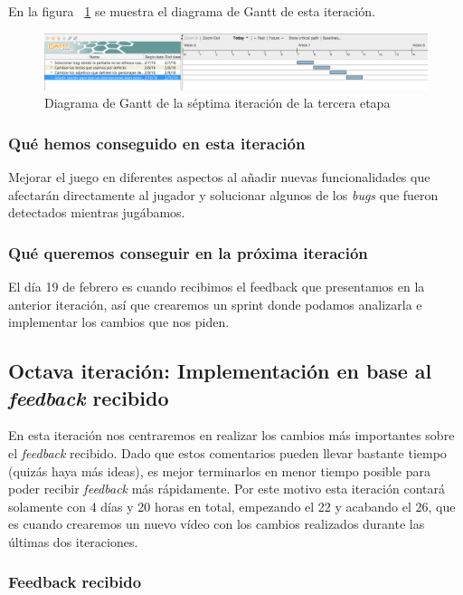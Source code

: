 En la figura ~\ref{fig:sec3it7} se muestra el diagrama de Gantt de esta iteración.

\begin{figure}
    \includegraphics[width=\textwidth,height=\textheight,keepaspectratio]{./img/sec3it7.png}
  \caption{Diagrama de Gantt de la séptima iteración de la tercera etapa}
  \label{fig:sec3it7}
\end{figure}

\subsubsection{Qué hemos conseguido en esta iteración}

Mejorar el juego en diferentes aspectos al añadir nuevas funcionalidades que afectarán directamente al jugador y solucionar algunos de los \textit{bugs} que fueron detectados mientras jugábamos.

\subsubsection{Qué queremos conseguir en la próxima iteración}

El día 19 de febrero es cuando recibimos el feedback que presentamos en la anterior iteración, así que crearemos un sprint donde podamos analizarla e implementar los cambios que nos piden.

\subsection{Octava iteración: Implementación en base al \textit{feedback} recibido}

En esta iteración nos centraremos en realizar los cambios más importantes sobre el \textit{feedback} recibido. Dado que estos comentarios pueden llevar bastante tiempo (quizás haya más ideas), es mejor terminarlos en menor tiempo posible para poder recibir \textit{feedback} más rápidamente.
Por este motivo esta iteración contará solamente con 4 días y 20 horas en total, empezando el 22 y acabando el 26, que es cuando crearemos un nuevo vídeo con los cambios realizados durante las últimas dos iteraciones.

\subsubsection{Feedback recibido}


